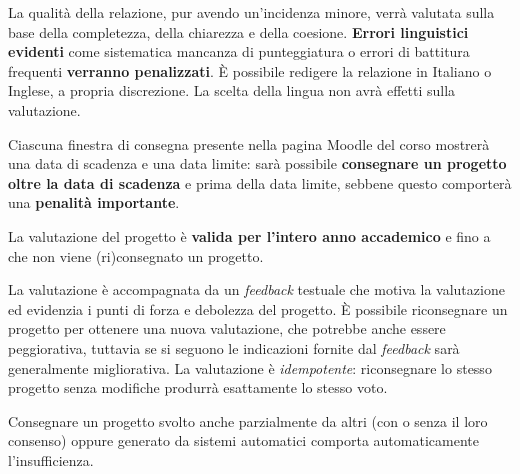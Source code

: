 \documentclass[10pt,a4paper,oneside]{article}
\begin{document}
La qualità della relazione, pur avendo un'incidenza minore, verrà valutata sulla base della completezza, della chiarezza e della coesione. \textbf{Errori linguistici evidenti} come sistematica mancanza di punteggiatura o errori di battitura frequenti \textbf{verranno penalizzati}. È possibile redigere la relazione in Italiano o Inglese, a propria discrezione. La scelta della lingua non avrà effetti sulla valutazione.

Ciascuna finestra di consegna presente nella pagina Moodle del corso mostrerà una data di scadenza e una data limite: sarà possibile \textbf{consegnare un progetto oltre la data di scadenza} e prima della data limite, sebbene questo comporterà una \textbf{penalità importante}.

La valutazione del progetto è \textbf{valida per l'intero anno accademico} e fino a che non viene (ri)consegnato un progetto.

La valutazione è accompagnata da un \emph{feedback} testuale che motiva la valutazione ed evidenzia i punti di forza e debolezza del progetto. È possibile riconsegnare un progetto per ottenere una nuova valutazione, che potrebbe anche essere peggiorativa, tuttavia se si seguono le indicazioni fornite dal \emph{feedback} sarà generalmente migliorativa. La valutazione è \emph{idempotente}: riconsegnare lo stesso progetto senza modifiche produrrà esattamente lo stesso voto.

Consegnare un progetto svolto anche parzialmente da altri (con o senza il loro consenso) oppure generato da sistemi automatici comporta automaticamente l'insufficienza.
\end{document}
